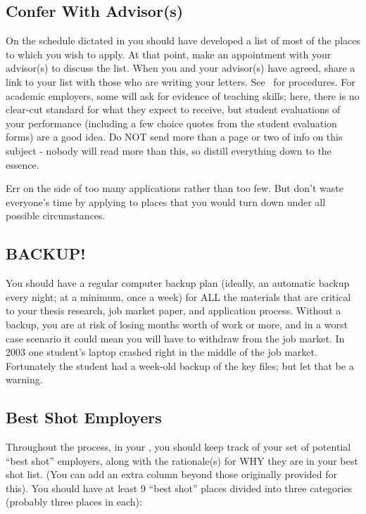 \documentclass{\classes/econtex}
\begin{document}
\hypertarget{confer-with-advisors}{}
\subsection*{Confer With Advisor(s)}
On the schedule dictated in {\timet}  you should have developed a list of most of the places to which you wish to apply.  At that point, make an appointment with your advisor(s) to discuss the list.  When you and your advisor(s) have agreed, share a link to your list with those who are writing your letters.  See \recLet~for procedures. For academic employers, some will ask for evidence of teaching skills; here, there is no clear-cut standard for what they expect to receive, but student evaluations of your performance (including a few choice quotes from the student evaluation forms) are a good idea.  Do NOT send more than a page or two of info on this subject - nobody will read more than this, so distill everything down to the essence.

Err on the side of too many applications rather than too few.  But
don't waste everyone's time by applying to places that you would turn
down under all possible circumstances.

\hypertarget{backup}{}
\subsection*{BACKUP!}
You should have a regular computer backup plan
(ideally, an automatic backup every night; at a minimum, once a week)
for ALL the materials that are critical to your thesis research,
job market paper, and application process.  Without a backup, you are
at risk of losing months worth of work or more, and in a worst case
scenario it could mean you will have to withdraw from the job market.
\hypertarget{best-shot}{}
In 2003 one student's laptop crashed right in the middle of the job
market.  Fortunately the student had a week-old backup of the key
files; but let that be a warning.

\subsection*{Best Shot Employers}
Throughout the process, in your {\EMW}, you should keep track of your set of potential ``best shot'' employers, along with the rationale(s) for WHY they are in your best shot list.  (You can add an extra column beyond those originally provided for this). You should have at least 9 ``best shot'' places divided into three categories (probably three places in each):
\end{document}

